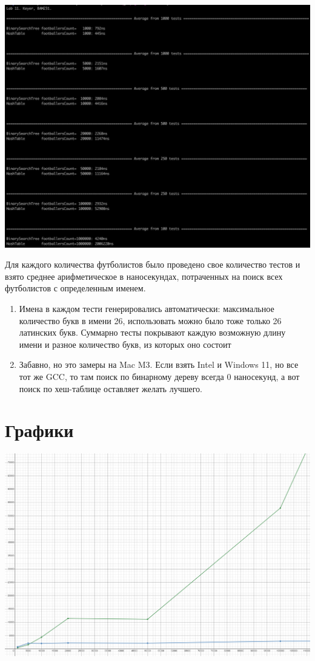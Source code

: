 \documentclass[12pt]{article}
\begin{document}
	\includegraphics[width=2\linewidth]{images/tests}
	
	Для каждого количества футболистов было проведено свое количество тестов и взято среднее арифметическое в наносекундах, потраченных на поиск всех футболистов с определенным именем.
	\begin{enumerate}
		\item Имена в каждом тести генерировались автоматически: максимальное количество букв в имени 26, использовать можно было тоже только 26 латинских букв. Суммарно тесты покрывают каждую возможную длину имени и разное количество букв, из которых оно состоит
		\item Забавно, но это замеры на Mac M3. Если взять Intel и Windows 11, но все тот же GCC, то там поиск по бинарному дереву всегда 0 наносекунд, а вот поиск по хеш-таблице оставляет желать лучшего.
	\end{enumerate}
	
	\section{Графики}


	\includegraphics[width=\linewidth]{images/graphics_1}
	
\end{document}
